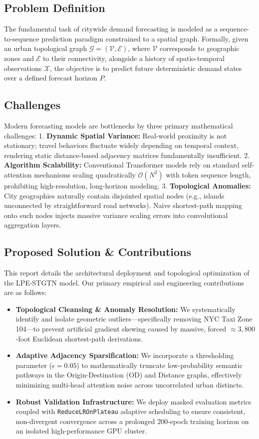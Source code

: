 \documentclass{rapportECL}
\begin{document}
\subsection{Problem Definition}
The fundamental task of citywide demand forecasting is modeled as a sequence-to-sequence prediction paradigm constrained to a spatial graph. Formally, given an urban topological graph $\mathcal{G} = (\mathcal{V}, \mathcal{E})$, where $\mathcal{V}$ corresponds to geographic zones and $\mathcal{E}$ to their connectivity, alongside a history of spatio-temporal observations $\mathcal{X}$, the objective is to predict future deterministic demand states over a defined forecast horizon $P$.

\subsection{Challenges}
Modern forecasting models are bottlenecks by three primary mathematical challenges:
1. \textbf{Dynamic Spatial Variance:} Real-world proximity is not stationary; travel behaviors fluctuate widely depending on temporal context, rendering static distance-based adjacency matrices fundamentally insufficient.
2. \textbf{Algorithm Scalability:} Conventional Transformer models rely on standard self-attention mechanisms scaling quadratically $\mathcal{O}(N^2)$ with token sequence length, prohibiting high-resolution, long-horizon modeling.
3. \textbf{Topological Anomalies:} City geographies naturally contain disjointed spatial nodes (e.g., islands unconnected by straightforward road networks). Naive shortest-path mapping onto such nodes injects massive variance scaling errors into convolutional aggregation layers.

\subsection{Proposed Solution \& Contributions}
This report details the architectural deployment and topological optimization of the LPE-STGTN model. Our primary empirical and engineering contributions are as follows:
\begin{itemize}
    \item \textbf{Topological Cleansing \& Anomaly Resolution:} We systematically identify and isolate geometric outliers—specifically removing NYC Taxi Zone 104—to prevent artificial gradient skewing caused by massive, forced $\approx 3,800$-foot Euclidean shortest-path derivations.
    \item \textbf{Adaptive Adjacency Sparsification:} We incorporate a thresholding parameter ($\epsilon=0.05$) to mathematically truncate low-probability semantic pathways in the Origin-Destination (OD) and Distance graphs, effectively minimizing multi-head attention noise across uncorrelated urban distincts.
    \item \textbf{Robust Validation Infrastructure:} We deploy masked evaluation metrics coupled with \texttt{ReduceLROnPlateau} adaptive scheduling to ensure consistent, non-divergent convergence across a prolonged 200-epoch training horizon on an isolated high-performance GPU cluster.
\end{itemize}
\end{document}
